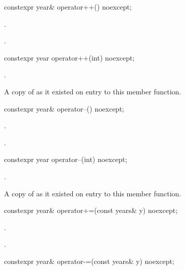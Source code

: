 %
\begin{itemdecl}
constexpr year& operator++() noexcept;
\end{itemdecl}

\begin{itemdescr}
\pnum
\effects
{}.

\pnum
\returns
{}.
\end{itemdescr}

%
\begin{itemdecl}
constexpr year operator++(int) noexcept;
\end{itemdecl}

\begin{itemdescr}
\pnum
\effects
{}.

\pnum
\returns
A copy of  as it existed on entry to this member function.
\end{itemdescr}

%
\begin{itemdecl}
constexpr year& operator--() noexcept;
\end{itemdecl}

\begin{itemdescr}
\pnum
\effects
{}.

\pnum
\returns
{}.
\end{itemdescr}

%
\begin{itemdecl}
constexpr year operator--(int) noexcept;
\end{itemdecl}

\begin{itemdescr}
\pnum
\effects
{}.

\pnum
\returns
A copy of  as it existed on entry to this member function.
\end{itemdescr}

%
\begin{itemdecl}
constexpr year& operator+=(const years& y) noexcept;
\end{itemdecl}

\begin{itemdescr}
\pnum
\effects
{}.

\pnum
\returns
{}.
\end{itemdescr}

%
\begin{itemdecl}
constexpr year& operator-=(const years& y) noexcept;
\end{itemdecl}

